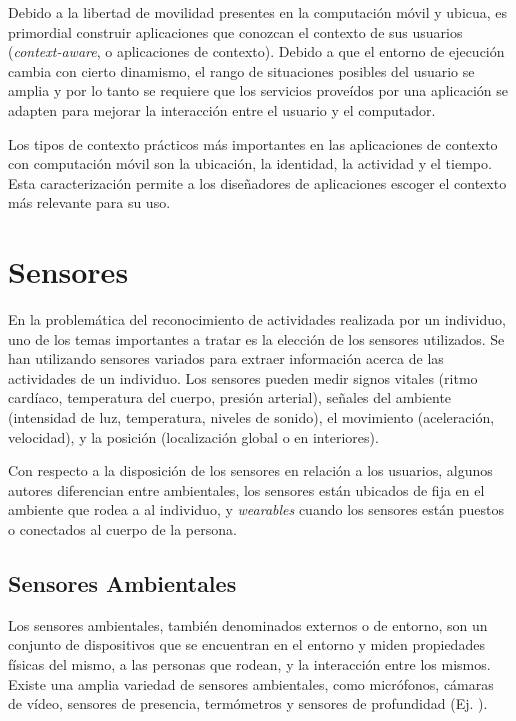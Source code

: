 Debido a la libertad de movilidad presentes en la computación móvil
y ubicua, es primordial construir aplicaciones que conozcan el contexto
de sus usuarios (\emph{context-aware}, o aplicaciones de contexto).
Debido a que el entorno de ejecución cambia con cierto dinamismo,
el rango de situaciones posibles del usuario se amplia y por lo tanto
se requiere que los servicios proveídos por una aplicación se adapten
para mejorar la interacción entre el usuario y el computador. 

Los tipos de contexto prácticos más importantes en las aplicaciones
de contexto con computación móvil son la ubicación, la identidad,
la actividad y el tiempo. Esta caracterización permite a los diseñadores
de aplicaciones escoger el contexto más relevante para su uso.

\section{Sensores}

\label{sec23:sensores} En la problemática del reconocimiento de actividades
realizada por un individuo, uno de los temas importantes a tratar
es la elección de los sensores utilizados. Se han utilizando sensores
variados para extraer información acerca de las actividades de un
individuo. Los sensores pueden medir signos vitales (ritmo cardíaco,
temperatura del cuerpo, presión arterial), señales del ambiente (intensidad
de luz, temperatura, niveles de sonido), el movimiento (aceleración,
velocidad), y la posición (localización global o en interiores). 

Con respecto a la disposición de los sensores en relación a los usuarios,
algunos autores \cite{ReyesOrtiz2015,LaraLabrador2013} diferencian
entre ambientales, los sensores están ubicados de fija en el ambiente
que rodea a al individuo, y \emph{wearables} cuando los sensores están
puestos o conectados al cuerpo de la persona.

\subsection{Sensores Ambientales}

Los sensores ambientales, también denominados externos o de entorno,
son un conjunto de dispositivos que se encuentran en el entorno y
miden propiedades físicas del mismo, a las personas que rodean, y
la interacción entre los mismos. Existe una amplia variedad de sensores
ambientales, como micrófonos, cámaras de vídeo, sensores de presencia,
termómetros y sensores de profundidad (Ej. ). 


